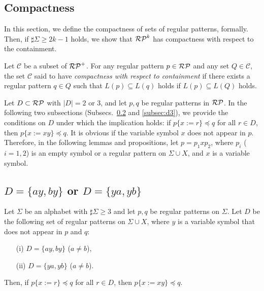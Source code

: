\subsection{Compactness}\label{subsec:compactness}

In this section, we define the compactness of sets of regular patterns, formally.
Then, if $\sharp\Sigma \ge 2k-1$ holds, 
we show that 
$\mathcal{RP}^{k}$ has compactness with respect to the containment.

\begin{dfn}\label{def:compactness}
Let $\mathcal{C}$ be a subset of $\mathcal{RP}^{+}$. 
For any regular pattern $p \in \mathcal{RP}$ and any set $Q \in \mathcal{C}$,
the set $\mathcal{C}$ said to have {\it compactness with respect to containment}
if there exists a regular pattern $q \in Q$ such that $L(p) \subseteq L(q)$ holds if $L(p) \subseteq L(Q)$ holds.
\end{dfn}

Let $D \subset \mathcal{RP}$ with $|D| = 2$ or $3$, and let $p,q$ be regular patterns in $\mathcal{RP}$.
In the following two subsections (Subsecs.~\ref{subsec:d2} and \ref{subsec:d3}), we provide the conditions on $D$ under which the implication holds: if $p \{ x := r \} \preceq q$ for all $r \in D$, then $p \{ x := xy \} \preceq q$.
It is obvious if the variable symbol $x$ does not appear in $p$.
Therefore, in the following lemmas and propositions, let $p=p_{1}xp_{2}$, where $p_{i}$ ($i=1,2$) is an empty symbol or a regular pattern on $\Sigma\cup X$, and $x$ is a variable symbol.

\subsection{$D=\{ ay, by \}$ or $D=\{ ya, yb \}$}\label{subsec:d2}

\begin{lem}\label{lem:twovariables}
Let $\Sigma$ be an alphabet with $\sharp\Sigma \ge 3$ and let $p,q$ be regular patterns on $\Sigma$.
Let $D$ be the following set of regular patterns on $\Sigma\cup X$, where $y$ is a variable symbol that does not appear in $p$ and $q$:
\begin{enumerate}
\item[{\rm (i)}] $D=\{ ay, by \}$ ($a \not= b$),
\item[{\rm (ii)}] $D=\{ ya, yb \}$ ($a \not= b$).
\end{enumerate}
Then, if $p \{ x := r \} \preceq q$ for all $r \in D$, then $p \{ x := xy \} \preceq q$.
\end{lem}


